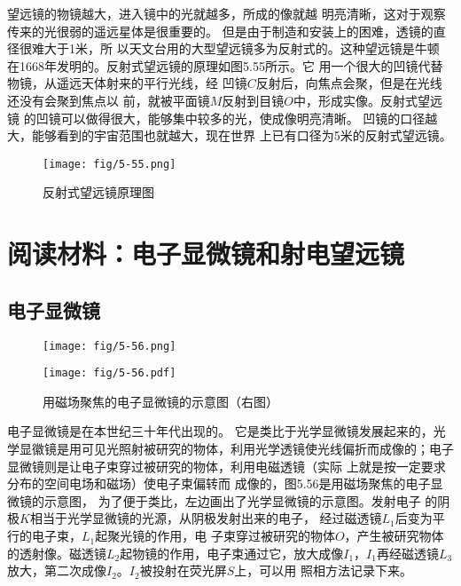 望远镜的物镜越大，进入镜中的光就越多，所成的像就越
明亮清晰，这对于观察传来的光很弱的遥远星体是很重要的。
但是由于制造和安装上的困难，透镜的直径很难大于1米，所
以天文台用的大型望远镜多为反射式的。这种望远镜是牛顿
在1668年发明的。反射式望远镜的原理如图5.55所示。它
用一个很大的凹镜代替物镜，从遥远天体射来的平行光线，经
凹镜$C$反射后，向焦点会聚，但是在光线还没有会聚到焦点以
前，就被平面镜$M$反射到目镜$O$中，形成实像。反射式望远镜
的凹镜可以做得很大，能够集中较多的光，使成像明亮清晰。
凹镜的口径越大，能够看到的宇宙范围也就越大，现在世界
上已有口径为5米的反射式望远镜。
\begin{figure}[htp]\centering
    \texttt{[image: fig/5-55.png]}
    \caption{反射式望远镜原理图}
    \end{figure}

\section*{阅读材料：电子显微镜和射电望远镜}
\subsection*{电子显微镜}

    \begin{figure}[htp]
        \centering
        \begin{minipage}[t]{0.48\textwidth}
        \centering
        \texttt{[image: fig/5-56.png]}
        \end{minipage}
        \begin{minipage}[t]{0.48\textwidth}
        \centering
        \texttt{[image: fig/5-56.pdf]}
        \end{minipage}
        \caption{用磁场聚焦的电子显微镜的示意图（右图）}
        \end{figure}

电子显微镜是在本世纪三十年代出现的。
它是类比于光学显微镜发展起来的，光学显徽镜是用可见光照射被研究的物体，利用光学透镜使光线偏折而成像的；电子
显微镜则是让电子束穿过被研究的物体，利用电磁透镜（实际
上就是按一定要求分布的空间电场和磁场）使电子束偏转而
成像的，图5.56是用磁场聚焦的电子显微镜的示意图，
为了便于类比，左边画出了光学显微镜的示意图。发射电子
的阴极$K$相当于光学显微镜的光源，从阴极发射出来的电子，
经过磁透镜$L_1$后变为平行的电子束，$L_1$起聚光镜的作用，电
子束穿过被研究的物体$O$，产生被研究物体的透射像。磁透镜$L_2$起物镜的作用，电子束通过它，放大成像$I_1$，$I_1$再经磁透镜$L_3$放大，第二次成像$I_2$。$I_2$被投射在荧光屏$S$上，可以用
照相方法记录下来。


